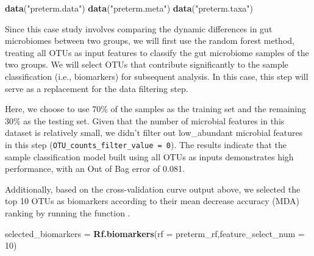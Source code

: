 \documentclass[
]{article}
\newenvironment{Shaded}{\begin{snugshade}}{\end{snugshade}}
\newcommand{\AttributeTok}[1]{\textcolor[rgb]{0.13,0.29,0.53}{#1}}
\newcommand{\DecValTok}[1]{\textcolor[rgb]{0.00,0.00,0.81}{#1}}
\newcommand{\FloatTok}[1]{\textcolor[rgb]{0.00,0.00,0.81}{#1}}
\newcommand{\FunctionTok}[1]{\textcolor[rgb]{0.13,0.29,0.53}{\textbf{#1}}}
\newcommand{\NormalTok}[1]{#1}
\newcommand{\OtherTok}[1]{\textcolor[rgb]{0.56,0.35,0.01}{#1}}
\newcommand{\SpecialCharTok}[1]{\textcolor[rgb]{0.81,0.36,0.00}{\textbf{#1}}}
\newcommand{\StringTok}[1]{\textcolor[rgb]{0.31,0.60,0.02}{#1}}
\begin{document}
\begin{Shaded}
\begin{Highlighting}[]
\FunctionTok{data}\NormalTok{(}\StringTok{"preterm.data"}\NormalTok{)}
\FunctionTok{data}\NormalTok{(}\StringTok{"preterm.meta"}\NormalTok{)}
\FunctionTok{data}\NormalTok{(}\StringTok{"preterm.taxa"}\NormalTok{)}
\end{Highlighting}
\end{Shaded}

Since this case study involves comparing the dynamic differences in gut
microbiomes between two groups, we will first use the random forest
method, treating all OTUs as input features to classify the gut
microbiome samples of the two groups. We will select OTUs that
contribute significantly to the sample classification (i.e., biomarkers)
for subsequent analysis. In this case, this step will serve as a
replacement for the data filtering step.

\begin{Shaded}
\end{Shaded}

Here, we choose to use 70\% of the samples as the training set and the
remaining 30\% as the testing set. Given that the number of microbial
features in this dataset is relatively small, we didn't filter out
low\_abundant microbial features in this step
(\texttt{OTU\_counts\_filter\_value\ =\ 0}). The results indicate that
the sample classification model built using all OTUs as inputs
demonstrates high performance, with an Out of Bag error of 0.081.

Additionally, based on the cross-validation curve output above, we
selected the top 10 OTUs as biomarkers according to their mean decrease
accuracy (MDA) ranking by running the function .

\begin{Shaded}
\begin{Highlighting}[]
\NormalTok{selected\_biomarkers }\OtherTok{=} \FunctionTok{Rf.biomarkers}\NormalTok{(}\AttributeTok{rf =}\NormalTok{ preterm\_rf,}\AttributeTok{feature\_select\_num =} \DecValTok{10}\NormalTok{)}
\end{Highlighting}
\end{Shaded}
\end{document}
